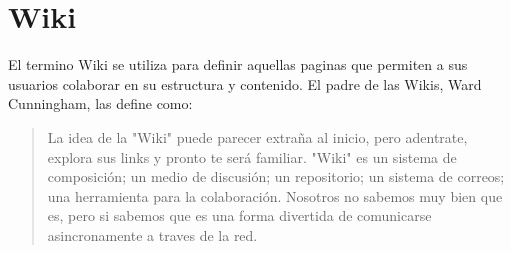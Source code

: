 \section{Wiki}

El termino Wiki se utiliza para definir aquellas paginas que permiten a sus usuarios colaborar en su estructura y contenido. El padre de las Wikis, Ward Cunningham, las define como: 

\begin{quote}
    La idea de la "Wiki" puede parecer extraña al inicio, pero adentrate, explora sus links y pronto te será familiar. "Wiki" es un sistema de composición; un medio de discusión; un repositorio; un sistema de correos; una herramienta para la colaboración. Nosotros no sabemos muy bien que es, pero si sabemos que es una forma divertida de comunicarse asincronamente a traves de la red.
\end{quote}
